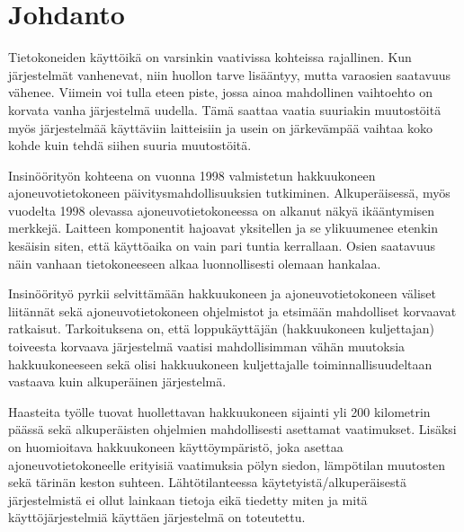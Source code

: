 \newpage

\pagestyle{plain}

\setcounter{page}{1} %
\ClearWallPaper

\chapter{Johdanto}

Tietokoneiden käyttöikä on varsinkin vaativissa kohteissa rajallinen. Kun järjestelmät vanhenevat, niin huollon tarve lisääntyy, mutta varaosien saatavuus vähenee. Viimein voi tulla eteen piste, jossa ainoa mahdollinen vaihtoehto on korvata vanha järjestelmä uudella. Tämä saattaa vaatia suuriakin muutostöitä myös järjestelmää käyttäviin laitteisiin ja usein on järkevämpää vaihtaa koko kohde kuin tehdä siihen suuria muutostöitä.

Insinöörityön kohteena on vuonna 1998 valmistetun hakkuukoneen ajoneuvotietokoneen päivitysmahdollisuuksien tutkiminen. Alkuperäisessä, myös vuodelta 1998 olevassa ajoneuvotietokoneessa on alkanut näkyä ikääntymisen merkkejä. Laitteen komponentit hajoavat yksitellen ja se ylikuumenee etenkin kesäisin siten, että käyttöaika on vain pari tuntia kerrallaan. Osien saatavuus näin vanhaan tietokoneeseen alkaa luonnollisesti olemaan hankalaa.

Insinöörityö pyrkii selvittämään hakkuukoneen ja ajoneuvotietokoneen väliset liitännät sekä ajoneuvotietokoneen ohjelmistot ja etsimään mahdolliset korvaavat ratkaisut. Tarkoituksena on, että loppukäyttäjän (hakkuukoneen kuljettajan) toiveesta korvaava järjestelmä vaatisi mahdollisimman vähän muutoksia hakkuukoneeseen sekä olisi hakkuukoneen kuljettajalle toiminnallisuudeltaan vastaava kuin alkuperäinen järjestelmä.

Haasteita työlle tuovat huollettavan hakkuukoneen sijainti yli 200 kilometrin päässä sekä alkuperäisten ohjelmien mahdollisesti asettamat vaatimukset. Lisäksi on huomioitava hakkuukoneen käyttöympäristö, joka asettaa ajoneuvotietokoneelle erityisiä vaatimuksia pölyn siedon, lämpötilan muutosten sekä tärinän keston suhteen. Lähtötilanteessa käytetyistä/alkuperäisestä järjestelmistä ei ollut lainkaan tietoja eikä tiedetty miten ja mitä käyttöjärjestelmiä käyttäen järjestelmä on toteutettu.

